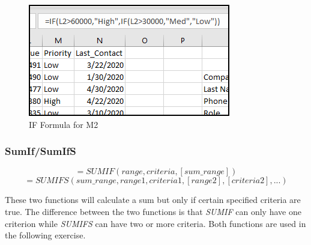 \begin{enumerate}
	\begin{figure}[H]
		\centering
		\includegraphics[width=\maxwidth{.95\linewidth}]{gfx/ch09_fig41}
		\caption{IF Formula for M2}
		\label{09:fig41}
	\end{figure}
	
\end{enumerate}

\subsubsection{SumIf/SumIfS}

\[ =SUMIF(range, criteria, [sum\_range]) \]
\[ =SUMIFS(sum\_range, range1, criteria1, [range2], [criteria2], ...) \]

These two functions will calculate a sum but only if certain specified criteria are true. The difference between the two functions is that \textit{SUMIF} can only have one criterion while \textit{SUMIFS} can have two or more criteria. Both functions are used in the following exercise.


